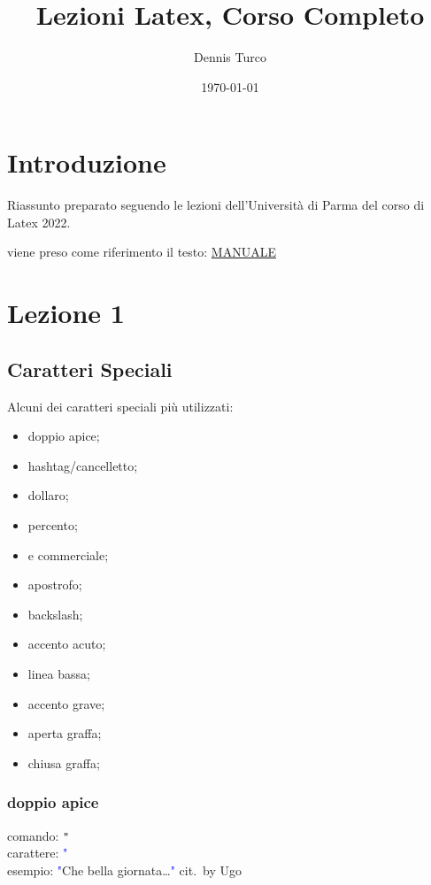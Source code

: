 \documentclass{article}
\title{Lezioni Latex, Corso Completo}
\author{Dennis Turco}
\date{\today}
\begin{document}
    \maketitle %
    \tableofcontents %

    \chapter{Introduzione}
        Riassunto preparato seguendo le lezioni dell'Università di Parma del corso di Latex 2022.

        viene preso come riferimento il testo: \href{https://www.dei.unipd.it/~addetto/manuali_online/ArteLaTeX.pdf}{MANUALE}
    

    \chapter{Lezione 1}

        \section{Caratteri Speciali}
        Alcuni dei caratteri speciali più utilizzati:

        \begin{itemize}
            \item doppio apice;
            \item hashtag/cancelletto;
            \item dollaro;
            \item percento;
            \item e commerciale;
            \item apostrofo;
            \item backslash;
            \item accento acuto;
            \item linea bassa;
            \item accento grave;
            \item aperta graffa;
            \item chiusa graffa; 
        \end{itemize}

        \subsection{doppio apice}
            comando: \verb!"! \\
            carattere: \textcolor{blue}{"} \\
            esempio: \textcolor{blue}{"}Che bella giornata\ldots \textcolor{blue}{"} cit.\ by Ugo
\end{document}
